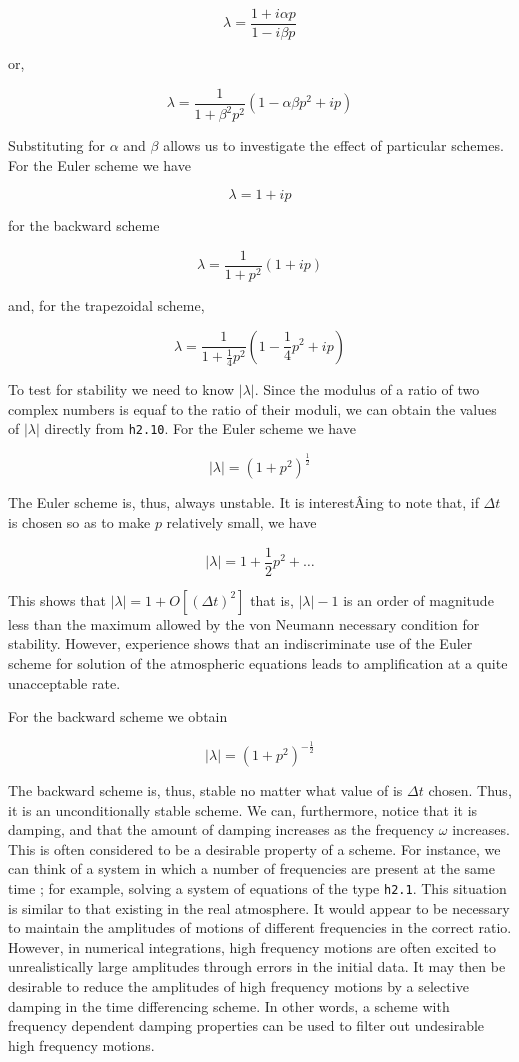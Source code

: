 \[\lambda = \frac{1 + i\alpha p}{1 - i\beta p}\]

or,

\[\lambda = \frac{1}{1 + \beta^2 p^2}( 1 - \alpha\beta p^{2} + ip )\]

Substituting for \(\alpha\) and \(\beta\) allows us to investigate the
effect of particular schemes. For the Euler scheme we have

\[\lambda = 1 + ip\]

for the backward scheme

\[\lambda = \frac{1}{1 + p^{2}}\left( 1 + ip \right)\]

and, for the trapezoidal scheme,

\[\lambda = \frac{1}{1 + \frac{1}{4}p^{2}}\left( 1 - \frac{1}{4}p^{2} + ip \right)\]

To test for stability we need to know \(| \lambda |\). Since the modulus
of a ratio of two complex numbers is equaf to the ratio of their moduli,
we can obtain the values of \(| \lambda |\) directly from
\texttt{h2.10}. For the Euler scheme we have

\[| \lambda | = \left( 1 + p^{2} \right)^{\frac{1}{2}}\]

The Euler scheme is, thus, always unstable. It is interestÂ­ing to note
that, if \(\Delta t\) is chosen so as to make \(p\) relatively small, we
have

\[| \lambda | = 1 + \frac{1}{2}p^{2} + \ldots\]

This shows that
\(| \lambda | = 1 + O\left\lbrack \left( \Delta t \right)^{2} \right\rbrack\)
that is, \(| \lambda | - 1\) is an order of magnitude less than the
maximum allowed by the von Neumann necessary condition for stability.
However, experience shows that an indiscriminate use of the Euler scheme
for solution of the atmospheric equations leads to amplification at a
quite unacceptable rate.

For the backward scheme we obtain

\[| \lambda |  = \left( 1 + p^{2} \right)^{-\frac{ 1}{2}}\]

The backward scheme is, thus, stable no matter what value of is
\(\Delta t\) chosen. Thus, it is an unconditionally stable scheme. We
can, furthermore, notice that it is damping, and that the amount of
damping increases as the frequency \(\omega\) increases. This is often
considered to be a desirable property of a scheme. For instance, we can
think of a system in which a number of frequencies are present at the
same time ; for example, solving a system of equations of the type
\texttt{h2.1}. This situation is similar to that existing in the real
atmosphere. It would appear to be necessary to maintain the amplitudes
of motions of different frequencies in the correct ratio. However, in
numerical integrations, high frequency motions are often excited to
unrealistically large amplitudes through errors in the initial data. It
may then be desirable to reduce the amplitudes of high frequency motions
by a selective damping in the time differencing scheme. In other words,
a scheme with frequency dependent damping properties can be used to
filter out undesirable high frequency motions.

